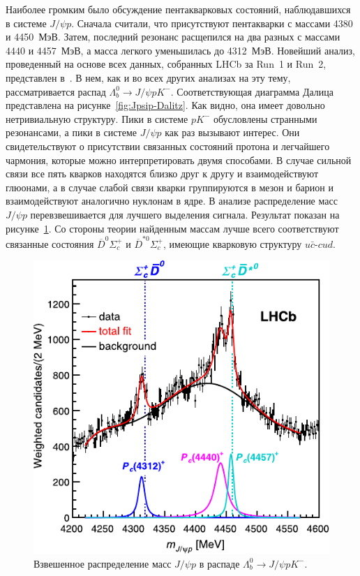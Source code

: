 \documentclass[a4paper, 10pt, twocolumn]{article}
\begin{document}
Наиболее громким было обсуждение пентакварковых состояний, 
наблюдавшихся в системе $J/\psi p$. Сначала считали, что присутствуют 
пентакварки с массами 4380 и 4450~МэВ. Затем, последний резонанс 
расщепился на два разных с массами 4440 и 4457~МэВ, а масса легкого 
уменьшилась до 4312~МэВ. Новейший анализ, проведенный на основе всех 
данных, собранных LHCb за Run~1 и Run~2, представлен 
в~\cite{pentaquark}. В нем, как и во всех других анализах на эту тему, 
рассматривается распад $\Lambda_b^0 \to J/\psi p K^-$. Соответствующая 
диаграмма Далица представлена на рисунке~\ref{fig:Jpsip-Dalitz}. Как 
видно, она имеет довольно нетривиальную структуру. Пики в системе 
$pK^-$ обусловлены странными резонансами, а пики в системе $J/\psi p$ 
как раз вызывают интерес. Они свидетельствуют о присутствии связанных 
состояний протона и легчайшего чармония, которые можно интерпретировать 
двумя способами. В случае сильной связи все пять кварков находятся 
близко друг к другу и взаимодействуют глюонами, а в случае слабой связи 
кварки группируются в мезон и барион и взаимодействуют аналогично 
нуклонам в ядре. В анализе распределение масс $J/\psi p$ 
перевзвешивается для лучшего выделения сигнала. Результат показан на 
рисунке~\ref{fig:Jpsip-mass}. Со стороны теории найденным массам лучше 
всего соответствуют связанные состояния $\overline{D}^0\Sigma_c^+$ 
и $\overline{D}^{*0}\Sigma_c^+$, имеющие кварковую структуру 
$u\bar{c}$-$cud$.

\begin{figure}%
	\centering
	\includegraphics[width=\linewidth]{figures/Jpsi-p-mass}
	\caption{Взвешенное распределение масс $J/\psi p$ в распаде $\Lambda_b^0 \to J/\psi p K^-$.}
	\label{fig:Jpsip-mass}
\end{figure}%
\end{document}

